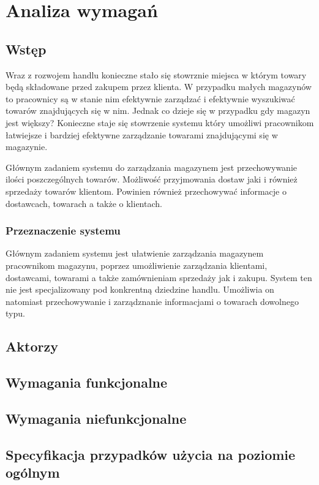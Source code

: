 \chapter{Analiza wymagań}

\section{Wstęp} 

Wraz z rozwojem handlu konieczne stało się stowrznie miejsca w którym towary
będą składowane przed zakupem  przez klienta. W przypadku małych magazynów to
pracownicy są w stanie nim efektywnie zarządzać i efektywnie wyszukiwać towarów
znajdujących się w nim. Jednak co dzieje się w przypadku gdy magazyn jest
większy? Konieczne staje się stowrzenie systemu który umożliwi pracownikom
łatwiejsze i bardziej efektywne zarządzanie towarami znajdującymi się w
magazynie.

Głównym zadaniem systemu do zarządzania magazynem jest przechowywanie ilości
poszczególnych towarów. Możliwość przyjmowania dostaw jaki i również sprzedaży
towarów klientom. Powinien również przechowywać informacje o dostawcach,
towarach a także o klientach.

\subsection{Przeznaczenie systemu}

Głównym zadaniem systemu jest ułatwienie zarządzania magazynem pracownikom
magazynu, poprzez umożliwienie zarządzania klientami, dostawcami, towarami a
także zamównieniam sprzedaży jak i zakupu. System ten nie jest specjalizowany
pod konkrentną dziedzine handlu. Umożliwia on natomiast przechowywanie i
zarządznanie informacjami o towarach dowolnego typu. 



\section{Aktorzy}

\section{Wymagania funkcjonalne}


\section{Wymagania niefunkcjonalne}

\section{Specyfikacja przypadków użycia na poziomie ogólnym}